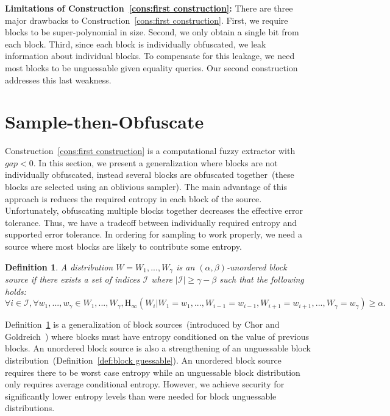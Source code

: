 \documentclass[11pt]{article}
\newcommand{\defref}[1]{\mbox{Definition~\ref{#1}}}
\newcommand{\consref}[1]{\mbox{Construction~\ref{#1}}}
\newcommand{\Hoo}{\mathrm{H}_\infty}
\newtheorem{definition}[theorem]{Definition}
\begin{document}
\textbf{Limitations of \consref{cons:first construction}:}  There are three major drawbacks to \consref{cons:first construction}.   First, we require blocks to be super-polynomial in size.  Second, we only obtain a single bit from each block.  Third, since each block is individually obfuscated, we leak information about individual blocks.  To compensate for this leakage, we need most blocks to be unguessable given equality queries.  Our second construction addresses this last weakness.

\section{Sample-then-Obfuscate}
\label{sec:sampling}
\consref{cons:first construction} is a computational fuzzy extractor with $gap<0$.  In this section, we present a generalization where blocks are not individually obfuscated, instead several blocks are obfuscated together~(these blocks are selected using an oblivious sampler).  The main advantage of this approach is reduces the required entropy in each block of the source.  Unfortunately, obfuscating multiple blocks together decreases the effective error tolerance.  Thus, we have a tradeoff between individually required entropy and supported error tolerance.  In ordering for sampling to work properly, we need a source where most blocks are likely to contribute some entropy.

\begin{definition}
\label{def:unordered source}
A distribution $W = W_1,..., W_\gamma$ is an $(\alpha, \beta)$-unordered block source if there exists a set of indices $\mathcal{I}$ where $|\mathcal{I}| \geq \gamma - \beta$ such that the following holds:
\[
\forall i\in \mathcal{I}, \forall w_1,..., w_\gamma \in W_1,..., W_\gamma, \Hoo(W_i | W_1 = w_1,..., W_{i-1}=w_{i-1}, W_{i+1}=w_{i+1},..., W_\gamma = w_\gamma) \geq \alpha.
\]
\end{definition}

\defref{def:unordered source} is a generalization of block sources~(introduced by Chor and Goldreich~\cite{DBLP:journals/siamcomp/ChorG88}) where blocks must have entropy conditioned on the value of previous blocks.  An unordered block source is also a strengthening of an unguessable block distribution~(\defref{def:block guessable}).  An unordered block source requires there to be worst case entropy while an unguessable block distribution only requires average conditional entropy.  However, we achieve security for significantly lower entropy levels than were needed for block unguessable distributions.  
\end{document}
